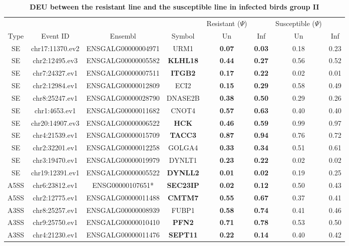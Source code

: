 \documentclass[10pt]{article}
\begin{document}
\begin{table}[!ht]
\caption{
\bf{DEU between the resistant line and the susceptible line in infected birds group II}}
\begin{tabular}{cccccccc}
\hline
& & & & Resistant ($\Psi$) & & Susceptible ($\Psi$) & \\
Type & Event ID & Ensembl & Symbol  & Un & Inf & Un & Inf \\
\hline
SE & chr17:11370.ev2 & ENSGALG00000004971 & URM1 & \textbf{0.07} & \textbf{0.03} & 0.18 & 0.23 \\
SE & chr2:12495.ev3 & ENSGALG00000005582 & \textbf{KLHL18} & \textbf{0.44} & \textbf{0.27} & 0.56 & 0.52 \\
SE & chr7:24327.ev1 & ENSGALG00000007511 & \textbf{ITGB2} & \textbf{0.17} & \textbf{0.22} & 0.02 & 0.01 \\
SE & chr2:12984.ev1 & ENSGALG00000012809 & ECI2 & \textbf{0.15} & \textbf{0.29} & 0.58 & 0.49 \\
SE & chr8:25247.ev1 & ENSGALG00000028790 & DNASE2B & \textbf{0.38} & \textbf{0.50} & 0.29 & 0.26 \\
SE & chr1:4653.ev1 & ENSGALG00000011682 & CNOT4 & \textbf{0.57} & \textbf{0.63} & 0.40 & 0.40 \\
SE & chr20:14907.ev3 & ENSGALG00000006522 & \textbf{HCK} & \textbf{0.46} & \textbf{0.59} & 0.99 & 0.97 \\
SE & chr4:21539.ev1 & ENSGALG00000015709 & \textbf{TACC3} & \textbf{0.87} & \textbf{0.94} & 0.76 & 0.72 \\
SE & chr2:32201.ev1 & ENSGALG00000012258 & GOLGA4 & \textbf{0.33} & \textbf{0.34} & 0.51 & 0.61 \\
SE & chr3:19470.ev1 & ENSGALG00000019979 & DYNLT1 & \textbf{0.23} & \textbf{0.22} & 0.02 & 0.02 \\
SE & chr19:12391.ev1 & ENSGALG00000005522 & \textbf{DYNLL2} & \textbf{0.01} & \textbf{0.02} & 0.19 & 0.25 \\
A5SS & chr6:23812.ev1 & ENSG00000107651* & \textbf{SEC23IP} & \textbf{0.02} & \textbf{0.12} & 0.50 & 0.43 \\
A5SS & chr2:12775.ev1 & ENSGALG00000011488 & \textbf{CMTM7} & \textbf{0.55} & \textbf{0.67} & 0.37 & 0.41 \\
A3SS & chr8:25257.ev1 & ENSGALG00000008939 & FUBP1 & \textbf{0.58} & \textbf{0.74} & 0.41 & 0.46 \\
A3SS & chr9:25750.ev1 & ENSGALG00000010410 & \textbf{PFN2} & \textbf{0.71} & \textbf{0.78} & 0.53 & 0.50 \\
A3SS & chr4:21230.ev1 & ENSGALG00000011476 & \textbf{SEPT11} & \textbf{0.22} & \textbf{0.14} & 0.40 & 0.42 \\

\end{tabular}
\end{table}
\end{document}
